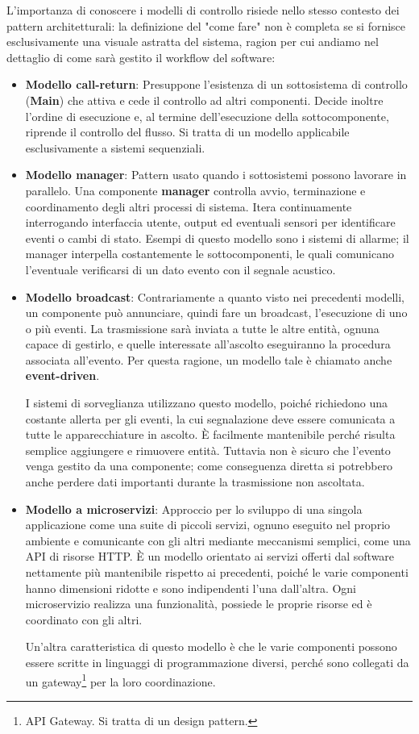 \noindent L'importanza di conoscere i modelli di controllo risiede nello stesso contesto dei pattern architetturali: la definizione del "come fare" non
è completa se si fornisce esclusivamente una visuale astratta del sistema, ragion per cui andiamo nel dettaglio di come sarà gestito il workflow del
software: \begin{itemize}
	\item \textbf{Modello call-return}: Presuppone l'esistenza di un sottosistema di controllo (\textbf{Main}) che attiva e cede il controllo ad altri
	componenti. Decide inoltre l'ordine di esecuzione e, al termine dell'esecuzione della sottocomponente, riprende il controllo del flusso. Si tratta
	di un modello applicabile esclusivamente a sistemi sequenziali.
	\item \textbf{Modello manager}: Pattern usato quando i sottosistemi possono lavorare in parallelo. Una componente \textbf{manager} controlla avvio,
	terminazione e coordinamento degli altri processi di sistema. Itera continuamente interrogando interfaccia utente, output ed eventuali sensori per
	identificare eventi o cambi di stato. Esempi di questo modello sono i sistemi di allarme; il manager interpella costantemente le sottocomponenti,
	le quali comunicano l'eventuale verificarsi di un dato evento con il segnale acustico.
	\item \textbf{Modello broadcast}: Contrariamente a quanto visto nei precedenti modelli, un componente può annunciare, quindi fare un broadcast,
	l'esecuzione di uno o più eventi. La trasmissione sarà inviata a tutte le altre entità, ognuna capace di gestirlo, e quelle interessate all'ascolto
	eseguiranno la procedura associata all'evento. Per questa ragione, un modello tale è chiamato anche \textbf{event-driven}.\par
	I sistemi di sorveglianza utilizzano questo modello, poiché richiedono una costante allerta per gli eventi, la cui segnalazione deve essere
	comunicata a tutte le apparecchiature in ascolto. È facilmente mantenibile perché risulta semplice aggiungere e rimuovere entità. Tuttavia non è
	sicuro che l'evento venga gestito da una componente; come conseguenza diretta si potrebbero anche perdere dati importanti durante la trasmissione
	non ascoltata.
	\item \textbf{Modello a microservizi}: Approccio per lo sviluppo di una singola applicazione come una suite di piccoli servizi, ognuno eseguito nel
	proprio ambiente e comunicante con gli altri mediante meccanismi semplici, come una API di risorse HTTP. È un modello orientato ai servizi offerti
	dal software nettamente più mantenibile rispetto ai precedenti, poiché le varie componenti hanno dimensioni ridotte e sono indipendenti l'una
	dall'altra. Ogni microservizio realizza una funzionalità, possiede le proprie risorse ed è coordinato con gli altri.\par
	Un'altra caratteristica di questo modello è che le varie componenti possono essere scritte in linguaggi di programmazione diversi, perché sono
	collegati da un gateway\footnote{API Gateway. Si tratta di un design pattern.} per la loro coordinazione.
\end{itemize}
